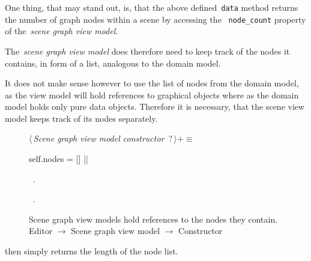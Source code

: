 \documentclass[%
    a4paper,    %
    justified,  %
    nobib,      %
    openany     %
]{tufte-book}
\begin{document}
One thing, that may stand out, is, that the above defined~\verb=data= method
returns the number of graph nodes within a scene by accessing the
~\verb=node_count= property of the~\emph{scene graph view model}.

The~\emph{scene graph view model} does therefore need to keep track of the nodes it
contains, in form of a list, analogous to the domain model.

It does not make sense however to use the list of nodes from the domain model,
as the view model will hold references to graphical objects where as the domain
model holds only pure data objects. Therefore it is necessary, that the scene
view model keeps track of its nodes separately.

\begin{figure}
\begin{flushleft} \small
\begin{minipage}{\linewidth}\label{scrap37}\raggedright\small
{} $\langle\,${\itshape Scene graph view model constructor}\nobreak\ {\footnotesize {?}}$\,\rangle+\equiv$
\vspace{-1ex}
\begin{pythoncode}
    self.nodes = []
|\NWsep|
\end{pythoncode}
\vspace{1.5ex}
\footnotesize
\begin{list}{}{\setlength{\itemsep}{-\parsep}\setlength{\itemindent}{-\leftmargin}}
\item \NWtxtMacroDefBy\ .
\item \NWtxtMacroRefIn\ .

\item{}
\end{list}
\end{minipage}\vspace{4ex}
\end{flushleft}
\caption{Scene graph view models hold references to the nodes they contain.
  \newline{}\newline{}Editor $\rightarrow$ Scene graph view model $\rightarrow$
  Constructor}
\label{editor:lst:scene-graph-view-model:constructor:nodes}
\end{figure}

 then simply returns the length of the node
list.
\end{document}

